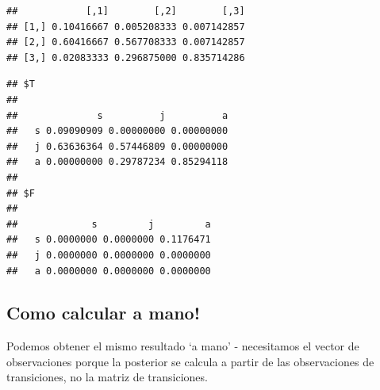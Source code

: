 \documentclass[
]{book}
\newenvironment{Shaded}{\begin{snugshade}}{\end{snugshade}}
\newcommand{\CommentTok}[1]{\textcolor[rgb]{0.56,0.35,0.01}{\textit{#1}}}
\newcommand{\DecValTok}[1]{\textcolor[rgb]{0.00,0.00,0.81}{#1}}
\newcommand{\FloatTok}[1]{\textcolor[rgb]{0.00,0.00,0.81}{#1}}
\newcommand{\FunctionTok}[1]{\textcolor[rgb]{0.13,0.29,0.53}{\textbf{#1}}}
\newcommand{\NormalTok}[1]{#1}
\newcommand{\OtherTok}[1]{\textcolor[rgb]{0.56,0.35,0.01}{#1}}
\newcommand{\SpecialCharTok}[1]{\textcolor[rgb]{0.81,0.36,0.00}{\textbf{#1}}}
\newcommand{\StringTok}[1]{\textcolor[rgb]{0.31,0.60,0.02}{#1}}
\theoremstyle{definition}
\theoremstyle{definition}
\theoremstyle{definition}
\theoremstyle{definition}
\theoremstyle{remark}
\begin{document}
\begin{verbatim}
##            [,1]        [,2]        [,3]
## [1,] 0.10416667 0.005208333 0.007142857
## [2,] 0.60416667 0.567708333 0.007142857
## [3,] 0.02083333 0.296875000 0.835714286
\end{verbatim}

\begin{Shaded}
\end{Shaded}

\begin{verbatim}
## $T
##    
##              s          j          a
##   s 0.09090909 0.00000000 0.00000000
##   j 0.63636364 0.57446809 0.00000000
##   a 0.00000000 0.29787234 0.85294118
## 
## $F
##    
##             s         j         a
##   s 0.0000000 0.0000000 0.1176471
##   j 0.0000000 0.0000000 0.0000000
##   a 0.0000000 0.0000000 0.0000000
\end{verbatim}

\subsection{Como calcular a mano!}\label{como-calcular-a-mano}

Podemos obtener el mismo resultado `a mano' - necesitamos el vector de
observaciones porque la posterior se calcula a partir de las
observaciones de transiciones, no la matriz de transiciones.

\begin{Shaded}
\end{Shaded}
\end{document}
